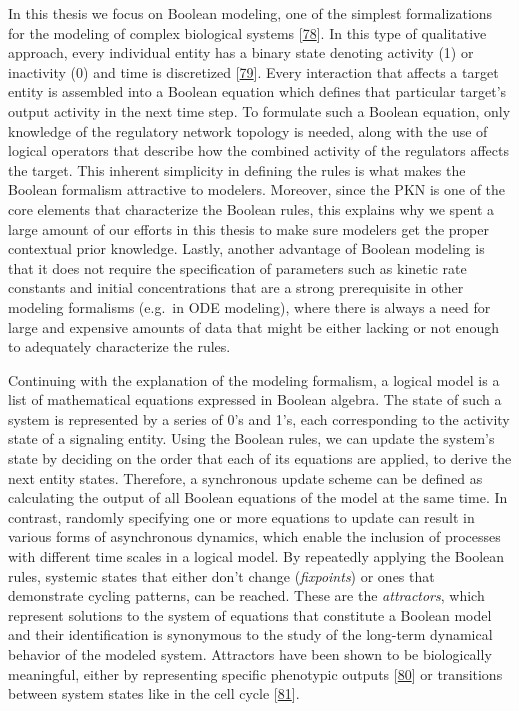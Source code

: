 \documentclass[
  12pt,
]{book}
\begin{document}
In this thesis we focus on Boolean modeling, one of the simplest formalizations for the modeling of complex biological systems {[}\protect\hyperlink{ref-Schwab2020}{78}{]}.
In this type of qualitative approach, every individual entity has a binary state denoting activity (1) or inactivity (0) and time is discretized {[}\protect\hyperlink{ref-Kauffman1969}{79}{]}.
Every interaction that affects a target entity is assembled into a Boolean equation which defines that particular target's output activity in the next time step.
To formulate such a Boolean equation, only knowledge of the regulatory network topology is needed, along with the use of logical operators that describe how the combined activity of the regulators affects the target.
This inherent simplicity in defining the rules is what makes the Boolean formalism attractive to modelers.
Moreover, since the PKN is one of the core elements that characterize the Boolean rules, this explains why we spent a large amount of our efforts in this thesis to make sure modelers get the proper contextual prior knowledge.
Lastly, another advantage of Boolean modeling is that it does not require the specification of parameters such as kinetic rate constants and initial concentrations that are a strong prerequisite in other modeling formalisms (e.g.~in ODE modeling), where there is always a need for large and expensive amounts of data that might be either lacking or not enough to adequately characterize the rules.

Continuing with the explanation of the modeling formalism, a logical model is a list of mathematical equations expressed in Boolean algebra.
The state of such a system is represented by a series of 0's and 1's, each corresponding to the activity state of a signaling entity.
Using the Boolean rules, we can update the system's state by deciding on the order that each of its equations are applied, to derive the next entity states.
Therefore, a synchronous update scheme can be defined as calculating the output of all Boolean equations of the model at the same time.
In contrast, randomly specifying one or more equations to update can result in various forms of asynchronous dynamics, which enable the inclusion of processes with different time scales in a logical model.
By repeatedly applying the Boolean rules, systemic states that either don't change (\emph{fixpoints}) or ones that demonstrate cycling patterns, can be reached.
These are the \emph{attractors}, which represent solutions to the system of equations that constitute a Boolean model and their identification is synonymous to the study of the long-term dynamical behavior of the modeled system.
Attractors have been shown to be biologically meaningful, either by representing specific phenotypic outputs {[}\protect\hyperlink{ref-Kauffman1993}{80}{]} or transitions between system states like in the cell cycle {[}\protect\hyperlink{ref-Faure2006}{81}{]}.
\end{document}
